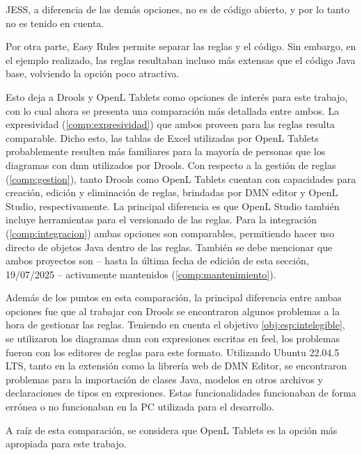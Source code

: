JESS, a diferencia de las demás opciones, no es de código abierto, y por lo tanto no es tenido en cuenta.

Por otra parte, Easy Rules permite separar las reglas y el código. 
Sin embargo, en el ejemplo realizado, las reglas resultaban incluso más extensas que el código Java base, volviendo la opción poco atractiva.

Esto deja a Drools y OpenL Tablets como opciones de interés para este trabajo, con lo cual ahora se presenta una comparación más detallada entre ambos. 
%
La expresividad (\cref{comp:expresividad}) que ambos proveen para las reglas resulta comparable. Dicho esto, las tablas de Excel utilizadas por OpenL Tablets probablemente resulten más familiares para la mayoría de personas que los diagramas con \acrfull{dmn} utilizados por Drools.
%
Con respecto a la gestión de reglas (\cref{comp:gestion}), tanto Drools como OpenL Tablets cuentan con capacidades para creación, edición y eliminación de reglas, brindadas por DMN editor y OpenL Studio, respectivamente. 
La principal diferencia es que OpenL Studio también incluye herramientas para el versionado de las reglas.
%
Para la integración (\cref{comp:integracion}) ambas opciones son comparables, permitiendo hacer uso directo de objetos Java dentro de las reglas.
%
También se debe mencionar que ambos proyectos son -- hasta la última fecha de edición de esta sección, 19/07/2025 -- activamente mantenidos (\cref{comp:mantenimiento}).


Además de los puntos en esta comparación, la principal diferencia entre ambas opciones fue que al trabajar con Drools se encontraron algunos problemas a la hora de gestionar las reglas. Teniendo en cuenta el objetivo \ref{obj:esp:intelegible}, se utilizaron los diagramas \acrshort{dmn} con expresiones escritas en \acrfull{feel}, los problemas fueron con los editores de reglas para este formato.
Utilizando Ubuntu 22.04.5 LTS, tanto en la extensión como la librería web de DMN Editor, se encontraron problemas para la importación de clases Java, modelos en otros archivos y declaraciones de tipos en expresiones. Estas funcionalidades funcionaban de forma errónea o no funcionaban en la PC utilizada para el desarrollo.

A raíz de esta comparación, se considera que OpenL Tablets es la opción más apropiada para este trabajo.

